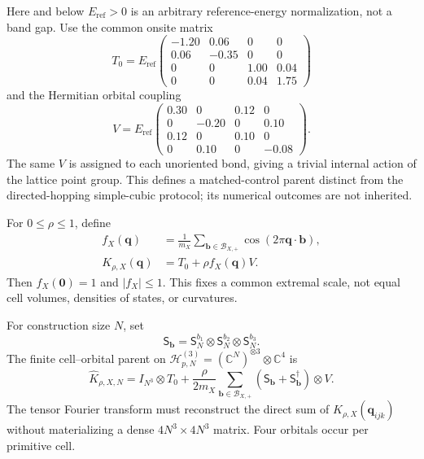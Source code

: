\documentclass[11pt]{article}
\begin{document}
Here and below $E_{\mathrm{ref}}>0$ is an arbitrary reference-energy normalization, not
a band gap. Use the common onsite matrix
\begin{equation}
 T_0=E_{\mathrm{ref}}
 \begin{pmatrix}
 -1.20&0.06&0&0\\
 0.06&-0.35&0&0\\
 0&0&1.00&0.04\\
 0&0&0.04&1.75
 \end{pmatrix}
\end{equation}
and the Hermitian orbital coupling
\begin{equation}
 V=E_{\mathrm{ref}}
 \begin{pmatrix}
 0.30&0&0.12&0\\
 0&-0.20&0&0.10\\
 0.12&0&0.10&0\\
 0&0.10&0&-0.08
 \end{pmatrix}.
 \label{eq:orbital-coupling}
\end{equation}
The same $V$ is assigned to each unoriented bond, giving a trivial internal action of
the lattice point group.  This defines a matched-control parent distinct from the
directed-hopping simple-cubic protocol; its numerical outcomes are not inherited.

For $0\le\rho\le1$, define
\begin{align}
 f_X(\mathbf q)
 &=\frac1{m_X}\sum_{\mathbf b\in\mathcal B_{X,+}}
   \cos(2\pi\mathbf q\cdot\mathbf b),\\
 K_{\rho,X}(\mathbf q)&=T_0+\rho f_X(\mathbf q)V.
 \label{eq:parent}
\end{align}
Then $f_X(\mathbf0)=1$ and $|f_X|\le1$.  This fixes a common extremal scale, not equal
cell volumes, densities of states, or curvatures.

For construction size $N$, set
\begin{equation}
 \mathsf S_{\mathbf b}
 =\mathsf S_N^{b_1}\otimes\mathsf S_N^{b_2}\otimes\mathsf S_N^{b_3}.
\end{equation}
The finite cell--orbital parent on
$\mathcal H_{p,N}^{(3)}=(\mathbb C^N)^{\otimes3}\otimes\mathbb C^4$ is
\begin{equation}
 \widehat K_{\rho,X,N}
 =I_{N^3}\otimes T_0
 +\frac{\rho}{2m_X}\sum_{\mathbf b\in\mathcal B_{X,+}}
  (\mathsf S_{\mathbf b}+\mathsf S_{\mathbf b}^{\dagger})\otimes V.
 \label{eq:finite-parent}
\end{equation}
The tensor Fourier transform must reconstruct the direct sum of
$K_{\rho,X}(\mathbf q_{ijk})$ without materializing a dense
$4N^3\times4N^3$ matrix.  Four orbitals occur per primitive cell.
\end{document}
